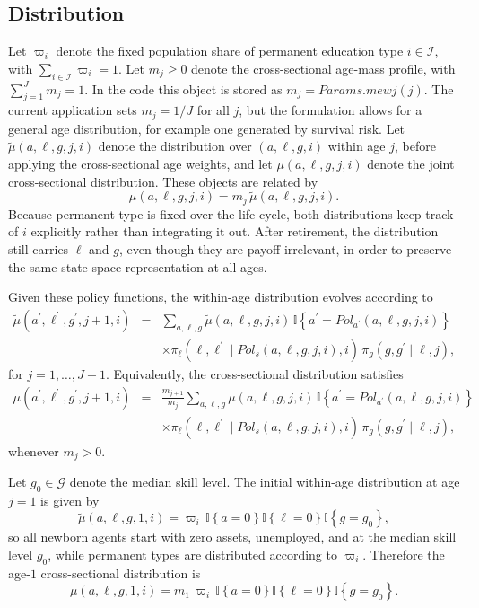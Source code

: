 \documentclass[11pt]{article}
\begin{document}
\subsection{Distribution}

Let $\varpi_i$ denote the fixed population share of permanent education type
$i\in \mathcal{I}$, with $\sum_{i\in \mathcal{I}}\varpi_i=1$. Let
$m_j\geq 0$ denote the cross-sectional age-mass profile, with
$\sum_{j=1}^{J}m_j=1$. In the code this object is stored as
$m_j=Params.mewj(j)$. The current application sets $m_j=1/J$ for all $j$,
but the formulation allows for a general age distribution, for example one
generated by survival risk. Let $\tilde{\mu}(a,\ell,g,j,i)$ denote the
distribution over $(a,\ell,g,i)$ within age $j$, before applying the
cross-sectional age weights, and let $\mu(a,\ell,g,j,i)$ denote the joint
cross-sectional distribution. These objects are related by
\begin{equation*}
\mu(a,\ell,g,j,i)=m_j\,\tilde{\mu}(a,\ell,g,j,i).
\end{equation*}
Because permanent type is fixed over the life cycle, both distributions keep
track of $i$ explicitly rather than integrating it out. After retirement, the
distribution still carries $\ell$ and $g$, even though they are
payoff-irrelevant, in order to preserve the same state-space representation
at all ages.

Given these policy functions, the within-age distribution evolves according
to
\begin{eqnarray*}
\tilde{\mu}(a^{\prime},\ell^{\prime},g^{\prime},j+1,i)
&=& \sum_{a,\ell,g}\tilde{\mu}(a,\ell,g,j,i)\,
\mathbb{I}\left\{a^{\prime}=Pol_{a^{\prime}}(a,\ell,g,j,i)\right\} \\
&&\times \pi_{\ell}(\ell,\ell^{\prime}\mid Pol_s(a,\ell,g,j,i),i)\,
\pi_g(g,g^{\prime}\mid \ell,j),
\end{eqnarray*}%
for $j=1,\ldots,J-1$.
Equivalently, the cross-sectional distribution satisfies
\begin{eqnarray*}
\mu(a^{\prime},\ell^{\prime},g^{\prime},j+1,i)
&=& \frac{m_{j+1}}{m_j}\sum_{a,\ell,g}\mu(a,\ell,g,j,i)\,
\mathbb{I}\left\{a^{\prime}=Pol_{a^{\prime}}(a,\ell,g,j,i)\right\} \\
&&\times \pi_{\ell}(\ell,\ell^{\prime}\mid Pol_s(a,\ell,g,j,i),i)\,
\pi_g(g,g^{\prime}\mid \ell,j),
\end{eqnarray*}%
whenever $m_j>0$.

Let $g_0\in \mathcal{G}$ denote the median skill level. The initial
within-age distribution at age $j=1$ is given by
\begin{equation*}
\tilde{\mu}(a,\ell,g,1,i)=\varpi_i\,\mathbb{I}\left\{a=0\right\}
\mathbb{I}\left\{\ell=0\right\}\mathbb{I}\left\{g=g_0\right\},
\end{equation*}%
so all newborn agents start with zero assets, unemployed, and at the median
skill level $g_0$, while permanent types are distributed according to
$\varpi_i$. Therefore the age-$1$ cross-sectional distribution is
\begin{equation*}
\mu(a,\ell,g,1,i)=m_1\,\varpi_i\,\mathbb{I}\left\{a=0\right\}
\mathbb{I}\left\{\ell=0\right\}\mathbb{I}\left\{g=g_0\right\}.
\end{equation*}
\end{document}
